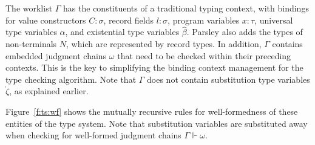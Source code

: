 \documentclass[letterpaper]{article}
\newcommand{\utv}{\alpha}             %
\newcommand{\etv}{{\widehat{\beta}}}  %
\newcommand{\stv}{{\grave{\zeta}}}    %
\begin{document}
The worklist $\Gamma$ has the constituents of a traditional typing
context, with bindings for value constructors $C:\sigma$, record
fields $l:\sigma$, program variables $x:\tau$, universal type
variables $\utv$, and existential type variables $\etv$.  Parsley also
adds the types of non-terminals $N$, which are represented by record
types.  In addition, $\Gamma$ contains embedded judgment chains
$\omega$ that need to be checked within their preceding contexts.
This is the key to simplifying the binding context management for the
type checking algorithm.  Note that $\Gamma$ does not contain
substitution type variables $\stv$, as explained earlier.

Figure~\ref{f:ts:wf} shows the mutually recursive rules for
well-formedness of these entities of the type system.  Note that
substitution variables are substituted away when checking for
well-formed judgment chains $\Gamma\Vdash\omega$.
\end{document}
